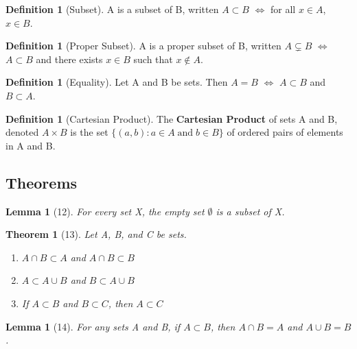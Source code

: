 \documentclass[12pt]{article}
\newtheorem*{thm*}{Theorem}
\newtheorem{lem}[thm]{Lemma}  %
\theoremstyle{definition}
\newtheorem{defn}[thm]{Definition}
\theoremstyle{remark}
\numberwithin{equation}{section}
\begin{document}
\begin{defn}[Subset]
        A is a subset of B, written $A \subset B$ $\iff$ for all $x \in A$, $x \in B$.
\end{defn}


\begin{defn}[Proper Subset]
        A is a proper subset of B, written $A \subsetneq B$ $\iff$ $A \subset B$ and there exists $x \in B$ such that $x \notin A$.
\end{defn}



\begin{defn}[Equality]
        Let A and B be sets. Then $A = B$ $\iff$ $A \subset B$ and $B \subset A$.
\end{defn}



\begin{defn}[Cartesian Product]
        The \textbf{Cartesian Product} of sets A and B, denoted $A \times B$ is the set $\{(a,b): a\in A\;\text{and}\; b \in B\}$ of ordered pairs of elements in A and B.
\end{defn}




\subsection{Theorems}


\begin{lem}[12]
        For every set X, the empty set $\emptyset$ is a subset of X.
\end{lem}


\begin{thm*}[13] Let A, B, and C be sets.
        \begin{enumerate}
                \item $A \cap B \subset A$ and $A \cap B \subset B$
                \item $A \subset A \cup B$ and $B \subset A \cup B$
                \item If $A \subset B$ and $B \subset C$, then $A \subset C$
        \end{enumerate}
\end{thm*}



\begin{lem}[14]
        For any sets A and B, if $A \subset B$, then $A \cap B = A$ and $A\cup B = B$.
\end{lem}
\end{document}
